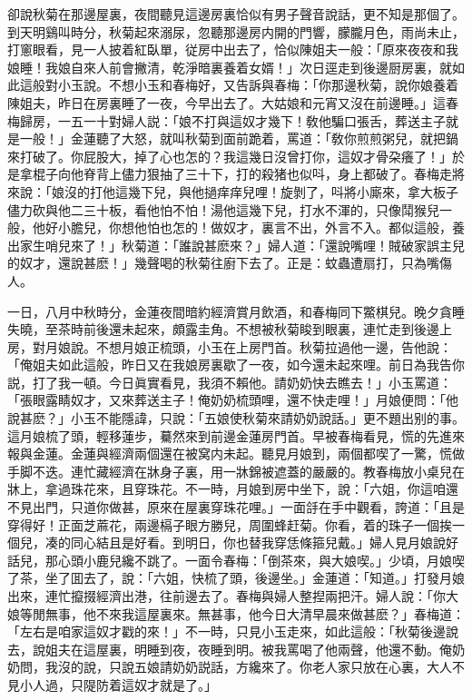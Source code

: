 卻說秋菊在那邊屋裏，夜間聽見這邊房裏恰似有男子聲音說話，更不知是那個了。到天明鷄叫時分，秋菊起來溺尿，忽聽那邊房内開的門響，朦朧月色，雨尚未止，打窻眼看，見一人披着紅臥單，従房中出去了，恰似陳姐夫一般：「原來夜夜和我娘睡！我娘自來人前會撇清，乾淨暗裏養着女婿！」次日逕走到後邊厨房裏，就如此這般對小玉說。不想小玉和春梅好，又告訴與春梅：「你那邊秋菊，說你娘養着陳姐夫，昨日在房裏睡了一夜，今早出去了。大姑娘和元宵又沒在前邊睡。」這春梅歸房，一五一十對婦人説：「娘不打與這奴才幾下！敎他騙口張舌，葬送主子就是一般！」金蓮聽了大怒，就叫秋菊到面前跪着，罵道：「敎你煎煎粥兒，就把鍋來打破了。你屁股大，掉了心也怎的？我這幾日沒曾打你，這奴才骨朶癢了！」於是拿棍子向他脊背上儘力狠抽了三十下，打的殺猪也似呌，身上都破了。春梅走將來說：「娘沒的打他這幾下兒，與他撾痒痒兒哩！旋剝了，呌將小廝來，拿大板子儘力砍與他二三十板，看他怕不怕！湯他這幾下兒，打水不渾的，只像鬦猴兒一般，他好小膽兒，你想他怕也怎的！做奴才，裏言不出，外言不入。都似這般，養出家生哨兒來了！」秋菊道：「誰說甚麽來？」婦人道：「還說嘴哩！賊破家誤主兒的奴才，還說甚麽！」幾聲喝的秋菊往廚下去了。正是：蚊蟲遭扇打，只為嘴傷人。

一日，八月中秋時分，金蓮夜間暗約經濟賞月飲酒，和春梅同下鱉棋兒。晚夕貪睡失曉，至茶時前後還未起來，頗露圭角。不想被秋菊睃到眼裏，連忙走到後邊上房，對月娘說。不想月娘正梳頭，小玉在上房門首。秋菊拉過他一邊，告他說：「俺姐夫如此這般，昨日又在我娘房裏歇了一夜，如今還未起來哩。前日為我告你説，打了我一頓。今日眞實看見，我須不賴他。請奶奶快去瞧去！」小玉罵道：「張眼露睛奴才，又來葬送主子！俺奶奶梳頭哩，還不快走哩！」月娘便問：「他說甚麽？」小玉不能隱諱，只說：「五娘使秋菊來請奶奶說話。」更不題出别的事。這月娘梳了頭，輕移蓮步，驀然來到前邊金蓮房門首。早被春梅看見，慌的先進來報與金蓮。金蓮與經濟兩個還在被窝内未起。聽見月娘到，兩個都喫了一驚，慌做手脚不迭。連忙藏經濟在牀身子裏，用一牀錦被遮蓋的嚴嚴的。教春梅放小桌兒在牀上，拿過珠花來，且穿珠花。不一時，月娘到房中坐下，說：「六姐，你這咱還不見出門，只道你做甚，原來在屋裏穿珠花哩。」一面㧱在手中觀看，誇道：「且是穿得好！正面芝蔴花，兩邊槅子眼方勝兒，周圍蜂赶菊。你看，着的珠子一個挨一個兒，凑的同心結且是好看。到明日，你也替我穿恁條箍兒戴。」婦人見月娘說好話兒，那心頭小鹿兒纔不跳了。一面令春梅：「倒茶來，與大娘喫。」少頃，月娘喫了茶，坐了囬去了，說：「六姐，快梳了頭，後邊坐。」金蓮道：「知道。」打發月娘出來，連忙攛掇經濟出港，往前邊去了。春梅與婦人整揑兩把汗。婦人說：「你大娘等閒無事，他不來我這屋裏來。無甚事，他今日大清早晨來做甚麽？」春梅道：「左右是咱家這奴才戳的來！」不一時，只見小玉走來，如此這般：「秋菊後邊說去，說姐夫在這屋裏，明睡到夜，夜睡到明。被我罵喝了他兩聲，他還不動。俺奶奶問，我沒的說，只說五娘請奶奶説話，方纔來了。你老人家只放在心裏，大人不見小人過，只隄防着這奴才就是了。」

